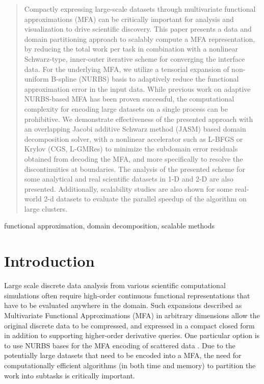 \documentclass[conference]{IEEEtran}
\begin{document}
\begin{abstract}
Compactly expressing large-scale datasets through multivariate functional approximations (MFA) can be critically important for analysis and visualization to drive scientific discovery. This paper presents a data and domain partitioning approach to scalably compute a MFA representation, by reducing the total work per task in combination with a nonlinear Schwarz-type, inner-outer iterative scheme for converging the interface data. For the underlying MFA, we utilize a tensorial expansion of non-uniform B-spline (NURBS) basis to adaptively reduce the functional approximation error in the input data. While previous work on adaptive NURBS-based MFA has been proven successful, the computational complexity for encoding large datasets on a single process can be prohibitive. We demonstrate effectiveness of the presented approach with an overlapping Jacobi additive Schwarz method (JASM) based domain decomposition solver, with a nonlinear accelerator such as L-BFGS or Krylov (CGS, L-GMRes) to minimize the subdomain error residuals obtained from decoding the MFA, and more specifically to resolve the discontinuities at boundaries. The analysis of the presented scheme for some analytical and real scientific datasets in 1-D and 2-D are also presented. Additionally, scalability studies are also shown for some real-world 2-d datasets to evaluate the parallel speedup of the algorithm on large clusters.
\end{abstract}

\begin{IEEEkeywords}
functional approximation, domain decomposition, scalable methods
\end{IEEEkeywords}

\section{Introduction}

Large scale discrete data analysis from various scientific computational simulations often require high-order continuous functional representations that have to be evaluated anywhere in the domain. Such expansions described as Multivariate Functional Approximations (MFA) in arbitrary dimensions \cite{nurbs-book} allow the original discrete data to be compressed, and expressed in a compact closed form in addition to supporting higher-order derivative queries. One particular option is to use NURBS bases for the MFA encoding of scattered data \cite{peterka-mfa}. Due to the potentially large datasets that need to be encoded into a MFA, the need for computationally efficient algorithms (in both time and memory) to partition the work into subtasks is critically important. 
\end{document}
